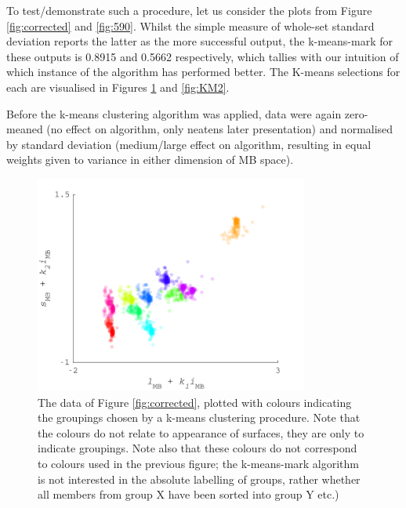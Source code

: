 
To test/demonstrate such a procedure, let us consider the plots from Figure \ref{fig:corrected} and \ref{fig:590}. Whilst the simple measure of whole-set standard deviation reports the latter as the more successful output, the k-means-mark for these outputs is 0.8915 and 0.5662 respectively, which tallies with our intuition of which instance of the algorithm has performed better. The K-means selections for each are visualised in Figures \ref{fig:KM1} and \ref{fig:KM2}.

Before the k-means clustering algorithm was applied, data were again zero-meaned (no effect on algorithm, only neatens later presentation) and normalised by standard deviation (medium/large effect on algorithm, resulting in equal weights given to variance in either dimension of \gls{MB} space).

\begin{figure}[htbp]
 \includegraphics[max width=0.8\textwidth]{figs/comp/KMeansMarkDemo/1.pdf}
 \caption{The data of Figure \ref{fig:corrected}, plotted with colours indicating the groupings chosen by a k-means clustering procedure. Note that the colours do not relate to appearance of surfaces, they are only to indicate groupings. Note also that these colours do not correspond to colours used in the previous figure; the k-means-mark algorithm is not interested in the absolute labelling of groups, rather whether all members from group X have been sorted into group Y etc.)}
 \label{fig:KM1}
\end{figure} 

